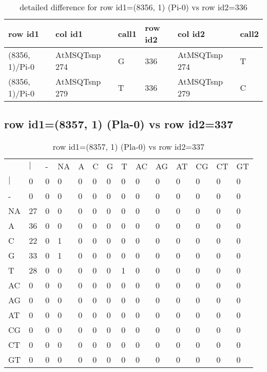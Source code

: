 \begin{center}
\begin{longtable}{|l|l|l|l|l|l|}
\caption{detailed difference for row id1=(8356, 1) (Pi-0) vs row id2=336} \label{table_dm579}\\
\hline
row id1&col id1&call1&row id2&col id2&call2\\
\hline
(8356, 1)/Pi-0&AtMSQTsnp 274&G&336&AtMSQTsnp 274&T\\
(8356, 1)/Pi-0&AtMSQTsnp 279&T&336&AtMSQTsnp 279&C\\
\hline
\end{longtable}
\end{center}

\subsection{row id1=(8357, 1) (Pla-0) vs row id2=337}
\begin{center}
\begin{longtable}{|l|l|l|l|l|l|l|l|l|l|l|l|l|l|}
\caption{row id1=(8357, 1) (Pla-0) vs row id2=337} \label{table_dm580}\\
\hline
\\
\hline
&$|$&-&NA&A&C&G&T&AC&AG&AT&CG&CT&GT\\
$|$&0&0&0&0&0&0&0&0&0&0&0&0&0\\
-&0&0&0&0&0&0&0&0&0&0&0&0&0\\
NA&27&0&0&0&0&0&0&0&0&0&0&0&0\\
A&36&0&0&0&0&0&0&0&0&0&0&0&0\\
C&22&0&1&0&0&0&0&0&0&0&0&0&0\\
G&33&0&1&0&0&0&0&0&0&0&0&0&0\\
T&28&0&0&0&0&0&1&0&0&0&0&0&0\\
AC&0&0&0&0&0&0&0&0&0&0&0&0&0\\
AG&0&0&0&0&0&0&0&0&0&0&0&0&0\\
AT&0&0&0&0&0&0&0&0&0&0&0&0&0\\
CG&0&0&0&0&0&0&0&0&0&0&0&0&0\\
CT&0&0&0&0&0&0&0&0&0&0&0&0&0\\
GT&0&0&0&0&0&0&0&0&0&0&0&0&0\\
\hline
\end{longtable}
\end{center}


